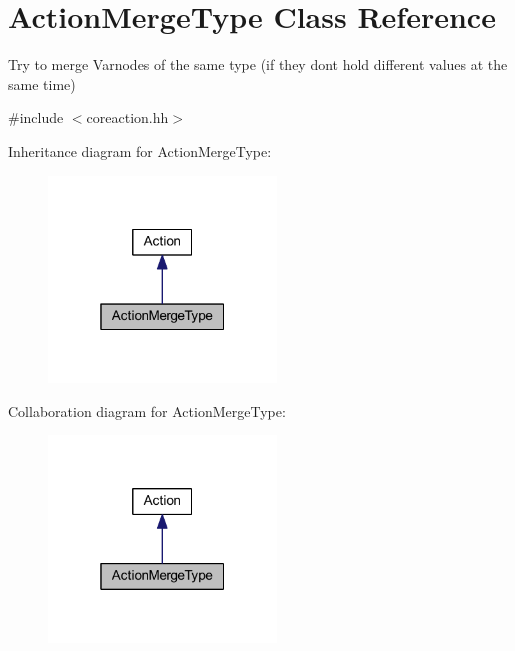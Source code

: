 \hypertarget{class_action_merge_type}{}\section{Action\+Merge\+Type Class Reference}
\label{class_action_merge_type}


Try to merge Varnodes of the same type (if they don\textquotesingle{}t hold different values at the same time)  




{\ttfamily \#include $<$coreaction.\+hh$>$}



Inheritance diagram for Action\+Merge\+Type\+:
\nopagebreak
\begin{figure}[H]
\begin{center}
\leavevmode
\includegraphics[width=172pt]{class_action_merge_type__inherit__graph}
\end{center}
\end{figure}


Collaboration diagram for Action\+Merge\+Type\+:
\nopagebreak
\begin{figure}[H]
\begin{center}
\leavevmode
\includegraphics[width=172pt]{class_action_merge_type__coll__graph}
\end{center}
\end{figure}
